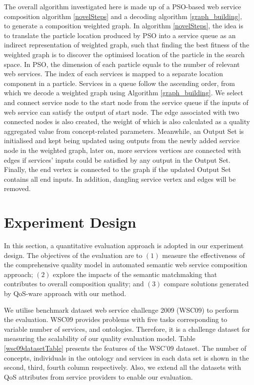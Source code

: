 \documentclass{IEEEtran}
\begin{document}
The overall algorithm investigated here is made up of a PSO-based web service composition algorithm \ref{novelSteps} and a decoding algorithm \ref{graph_building}, to generate a composition weighted graph. In algorithm \ref{novelSteps}, the idea is to translate the particle location produced by PSO into a service queue as an indirect representation of weighted graph, such that finding the best fitness of the weighted graph is to discover the optimised location of the particle in the search space. In PSO, the dimension of each particle equals to the number of relevant web services. The index of each services is mapped to a separate location component in a particle. Services in a queue follow the ascending order, from which we decode a weighted graph using Algorithm \ref{graph_building}. We select and connect  service node to the start node from the service queue if the inputs of web service can satisfy the output of start node. The edge associated with two connected nodes is also created, the weight of which is also calculated as a quality aggregated value from concept-related parameters. Meanwhile, an Output Set is initialised and kept being updated using outputs from the newly added service node in the weighted graph, later on, more services vertices are connected with edges if services' inputs could be satisfied by any output in the Output Set. Finally, the end vertex is connected to the graph if the updated Output Set contains all end inputs. In addition, dangling service vertex and edges will be removed. 
\section{Experiment Design}\label{experiment_design}
In this section, a quantitative evaluation approach is adopted in our experiment design. The objectives of the evaluation are to $(1)$ measure the effectiveness of the comprehensive quality model in automated semantic web service composition approach; $(2)$ explore the impacts of the semantic matchmaking that contributes to overall composition quality; and $(3)$ compare solutions generated by QoS-ware approach with our method.

We utilise benchmark dataset web service challenge 2009 (WSC09) \cite{kona2009wsc} to perform the evaluation. WSC09 provides problems with five tasks corresponding to variable number of services, and ontologies. Therefore, it is a challenge dataset for measuring the scalability of our quality evaluation model. Table \ref{wsc09datasetTable} presents the features of the WSC’09 dataset. The number of concepts, individuals in the ontology and services in each data set is shown in the second, third, fourth column respectively. Also, we extend all the datasets with QoS attributes from service providers to enable our evaluation. 
\end{document}
